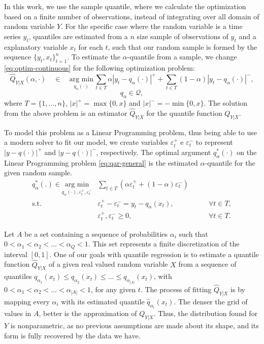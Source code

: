 In this work, we use the sample quantile,  where we calculate the optimization based on a finite number of observations, instead of integrating over all domain of random variable $Y$. For the specific case where the random variable is a time series $y_t$, quantiles are estimated from a $n$ size sample of observations of $y_t$ and a explanatory variable $x_t$ for each $t$, such that our random sample is formed by the sequence $\{y_t,x_t \}_{t=1}^n$. To estimate the $\alpha$-quantile from a sample, we change \ref{eq:optim-continuous} for the following optimization problem:
\begin{equation}
\hat{Q}_{Y|X}(\alpha, \cdot)\quad \in\quad\underset{q_\alpha(\cdot)}{\text{arg min}}\,\sum_{t \in T}\alpha|y_{t}-q_\alpha(\cdot)|^{+}+\sum_{t \in T}(1-\alpha)|y_{t}-q_\alpha(\cdot)|^{-},
\label{eq:linear-model}
\end{equation}
\begin{equation}
q_\alpha  \in \mathcal{Q},
\end{equation}
where $T = \{1, \dots, n \}$, $|x|^+=\max\{0,x\}$ and $|x|^-=-\min\{0,x\}$. The solution from the above problem is an estimator $\hat{Q}_{Y|X}$ for the quantile function $Q_{Y|X}$.

To model this problem as a Linear Programming problem, thus being able to use a modern solver to fit our model,  we create variables $\varepsilon^+_t$ e $\varepsilon^-_t$ to represent $|y-q(\cdot)|^+$ and $|y-q(\cdot)|^-$, respectively. The optimal argument $q_\alpha^*(\cdot)$ on the Linear Programming problem \ref{eq:qar-general} is the estimated $\alpha$-quantile for the given random sample.
\begin{equation}
\begin{aligned}q^*_\alpha(.) \in \underset{q_\alpha (\cdot),\varepsilon_{t}^{+}, \varepsilon_{t}^{-}}{\text{arg min}} & \sum_{t \in T}\left(\alpha \varepsilon_{t}^{+}+(1-\alpha)\varepsilon_{t}^{-}\right) & \\
\mbox{s.t. } & \varepsilon_{t}^{+}-\varepsilon_{t}^{-}=y_{t}-q_\alpha(x_t), & \qquad\forall t \in T,\\
& \varepsilon_t^+,\varepsilon_t^- \geq 0, & \qquad \forall t \in T.
\end{aligned}
\label{eq:qar-general}
\end{equation}

Let $A$ be a set containing a sequence of probabilities  $\alpha_i$ such that $0 < \alpha_1 < \alpha_2 < \dots < \alpha_Q < 1$. This set represents a finite discretization of the interval $[0,1]$.
One of our goals with quantile regression is to estimate a quantile function $\hat{Q}_{Y|X}$ of a given real valued random variable $X$ from a sequence of quantiles $q_{\alpha_1}(x_t) \leq q_{\alpha_2}(x_t) \leq \dots \leq q_{\alpha_{|A|}}(x_t)$, with $0 < \alpha_1 < \alpha_2 < \dots < \alpha_{|A|} < 1$, for any given $t$.
The process of fitting $\hat{Q}_{Y|X}$ is by mapping every $\alpha_i$ with its estimated quantile $\hat{q}_{\alpha_i}(x_t)$.
The denser the grid of values in $A$, better is the approximation of $Q_{Y|X}$.
Thus, the distribution found for $Y$ is nonparametric, as no previous assumptions are made about its shape, and its form is fully recovered by the data we have.

